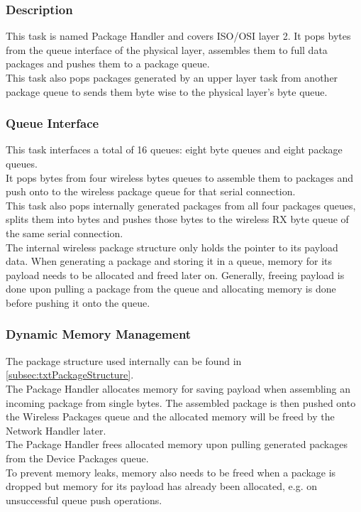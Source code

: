 \subsubsection{Description}
This task is named Package Handler and covers ISO/OSI layer 2. It pops bytes from the queue interface of the physical layer, assembles them to full data packages and pushes them to a package queue.\\
This task also pops packages generated by an upper layer task from another package queue to sends them byte wise to the physical layer's byte queue.
\subsubsection{Queue Interface}
This task interfaces a total of 16 queues: eight byte queues and eight package queues.\\
It pops bytes from four wireless bytes queues to assemble them to packages and push onto to the wireless package queue for that serial connection.\\
This task also pops internally generated packages from all four packages queues, splits them into bytes and pushes those bytes to the wireless RX byte queue of the same serial connection.\\
The internal wireless package structure only holds the pointer to its payload data. When generating a package and storing it in a queue, memory for its payload needs to be allocated and freed later on. Generally, freeing payload is done upon pulling a package from the queue and allocating memory is done before pushing it onto the queue.
\subsubsection{Dynamic Memory Management}
The package structure used internally can be found in \autoref{subsec:txtPackageStructure}.\\
The Package Handler allocates memory for saving payload when assembling an incoming package from single bytes. The assembled package is then pushed onto the Wireless Packages queue and the allocated memory will be freed by the Network Handler later.\\
The Package Handler frees allocated memory upon pulling generated packages from the Device Packages queue.\\
To prevent memory leaks, memory also needs to be freed when a package is dropped but memory for its payload has already been allocated, e.g. on unsuccessful queue push operations.
